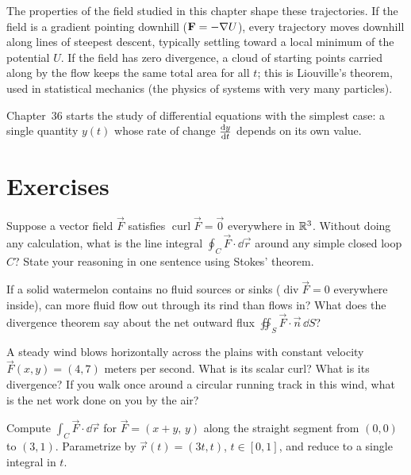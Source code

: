 The properties of the field studied in this chapter shape these trajectories.
If the field is a gradient pointing downhill ($\mathbf{F} = -\nabla U$), every trajectory
moves downhill along lines of steepest descent, typically settling toward a local
minimum of the potential $U$. If the field has zero divergence, a cloud of starting
points carried along by the flow keeps the same total area for all $t$; this is
Liouville's theorem, used in statistical mechanics (the physics of systems with very
many particles).

Chapter~36 starts the study of differential equations with the simplest case: a
single quantity $y(t)$ whose rate of change $\frac{\mathrm{d} y}{\mathrm{d} t}$ depends on its own value.

\section{Exercises}
\label{ch35:exercises}

\begin{exercise}
\label{ch35:exr-mental-curl}
Suppose a vector field $\vec F$ satisfies $\operatorname{curl}\vec F = \vec 0$ everywhere in $\mathbb{R}^3$. Without doing any calculation, what is the line integral $\oint_C \vec F\cdot\dd\vec r$ around any simple closed loop $C$? State your reasoning in one sentence using Stokes' theorem.
\end{exercise}

\begin{exercise}
\label{ch35:exr-mental-flux}
If a solid watermelon contains no fluid sources or sinks ($\operatorname{div}\vec F = 0$ everywhere inside), can more fluid flow out through its rind than flows in? What does the divergence theorem say about the net outward flux $\oiint_S \vec F\cdot\vec n\,\dd S$?
\end{exercise}

\begin{exercise}
\label{ch35:exr-mental-constant}
A steady wind blows horizontally across the plains with constant velocity $\vec F(x,y) = (4, 7)$ meters per second. What is its scalar curl? What is its divergence? If you walk once around a circular running track in this wind, what is the net work done on you by the air?
\end{exercise}

\begin{exercise}
\label{ch35:exr-lineint}
Compute $\displaystyle\int_C \vec F\cdot\dd\vec r$ for $\vec F=(x+y,\,y)$ along the
straight segment from $(0,0)$ to $(3,1)$. Parametrize by $\vec r(t)=(3t,t)$,
$t\in[0,1]$, and reduce to a single integral in $t$.
\end{exercise}

